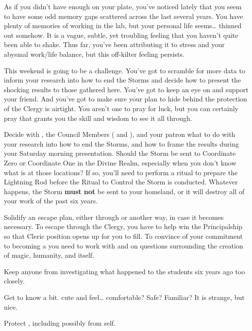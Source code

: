 \documentclass[char]{GL2020}
\begin{document}
As if you didn't have enough on your plate, you've noticed lately that you seem to have some odd memory gaps scattered across the last several years. You have plenty of memories of working in the lab, but your personal life seems\ldots{} thinned out somehow. It is a vague, subtle, yet troubling feeling that you haven't quite been able to shake. Thus far, you've been attributing it to stress and your abysmal work/life balance, but this off-kilter feeling persists.

This weekend is going to be a challenge. You've got to scramble for more data to inform your research into how to end the Storms and decide how to present the shocking results to those gathered here. You've got to keep an eye on \cChupInventor{} and support your friend. And you've got to make sure your plan to hide behind the protection of the Clergy is airtight. You aren't one to pray for luck, but you can certainly pray that \cTechGod{} grants you the skill and wisdom to see it all through.

\begin{itemz}
    \item Decide with \cAssistantScientist{}, the Council Members (\cAntiChup{} and \cTechStar{}), and your patron \cDiplomat{} what to do with your research into how to end the Storms, and how to frame the results during your Saturday morning presentation. Should the Storm be sent to Coordinate Zero or Coordinate One in the Divine Realm, especially when you don’t know what is at those locations? If so, you'll need to perform a ritual to prepare the Lightning Rod before the Ritual to Control the Storm is conducted. Whatever happens, the Storm \textbf{must not} be sent to your homeland, or it will destroy all of your work of the past six years.
    \item Solidify an escape plan, either through \cBeetle{} or another way, in case it becomes necessary. To escape through the Clergy, you have to help \cBeetle{} win the Principalship so that \cBeetle{\their} Cleric position opens up for you to fill. To convince \cBeetle{} of your commitment to becoming a \cHeadScientist{\cleric} you need to work with \cEbbPriest{} and \cScholarship{} on questions surrounding the creation of magic, humanity, and \pEarth{} itself.
    \item Keep anyone from investigating what happened to the students six years ago too closely.
\end{itemz}

\begin{itemz}
    \item Get to know \cChupAvenger{} a bit. \cChupAvenger{\Theyare} cute and feel\cChupAvenger{\verbs}\ldots{} comfortable? Safe? Familiar? It is strange, but nice.
    \item Protect \cChupInventor{}, including possibly from \cChupInventor{\them}self.
\end{itemz}
\end{document}
